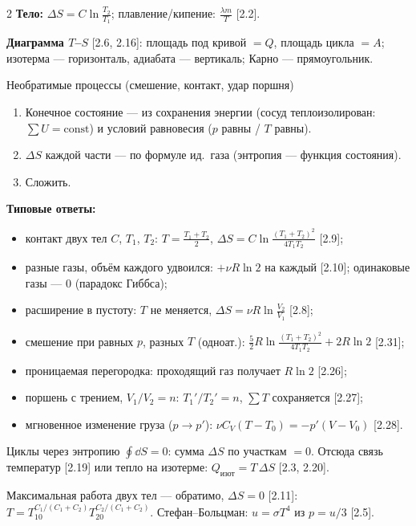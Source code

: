 \documentclass[10pt]{article}
\newcommand{\see}[1]{\textcolor{excol}{[#1]}}
\begin{document}
\begin{multicols}{2}
\textbf{Тело:} $\Delta S=C\ln\frac{T_2}{T_1}$; плавление/кипение: $\frac{\lambda m}{T}$ \see{2.2}.

\textbf{Диаграмма $T$--$S$} \see{2.6, 2.16}: площадь под кривой $=Q$, площадь цикла $=A$;
изотерма — горизонталь, адиабата — вертикаль; Карно — прямоугольник.

\begin{method}{Необратимые процессы (смешение, контакт, удар поршня)}
\begin{enumerate}
\item Конечное состояние — из сохранения энергии (сосуд теплоизолирован: $\sum U=\text{const}$)
и условий равновесия ($p$ равны / $T$ равны).
\item $\Delta S$ каждой части — по формуле ид.\ газа (энтропия — функция состояния).
\item Сложить.
\end{enumerate}
\end{method}

\textbf{Типовые ответы:}
\begin{itemize}
\item контакт двух тел $C$, $T_1$, $T_2$: $T=\frac{T_1+T_2}2$, $\Delta S=C\ln\frac{(T_1+T_2)^2}{4T_1T_2}$ \see{2.9};
\item разные газы, объём каждого удвоился: $+\nu R\ln2$ на каждый \see{2.10}; одинаковые газы — $0$ (парадокс Гиббса);
\item расширение в пустоту: $T$ не меняется, $\Delta S=\nu R\ln\frac{V_2}{V_1}$ \see{2.8};
\item смешение при равных $p$, разных $T$ (одноат.): $\frac52R\ln\frac{(T_1+T_2)^2}{4T_1T_2}+2R\ln2$ \see{2.31};
\item проницаемая перегородка: проходящий газ получает $R\ln2$ \see{2.26};
\item поршень с трением, $V_1/V_2=n$: $T_1'/T_2'=n$, $\sum T$ сохраняется \see{2.27};
\item мгновенное изменение груза ($p\to p'$): $\nu C_V(T-T_0)=-p'(V-V_0)$ \see{2.28}.
\end{itemize}

\begin{method}{Циклы через энтропию}
$\oint\dd S=0$: сумма $\Delta S$ по участкам $=0$. Отсюда связь температур \see{2.19} или тепло на изотерме:
$Q_{\text{изот}}=T\,\Delta S$ \see{2.3, 2.20}.
\end{method}

Максимальная работа двух тел — обратимо, $\Delta S=0$ \see{2.11}:
$T=T_{10}^{C_1/(C_1+C_2)}T_{20}^{C_2/(C_1+C_2)}$.
Стефан–Больцман: $u=\sigma T^4$ из $p=u/3$ \see{2.5}.


\end{multicols}
\end{document}
